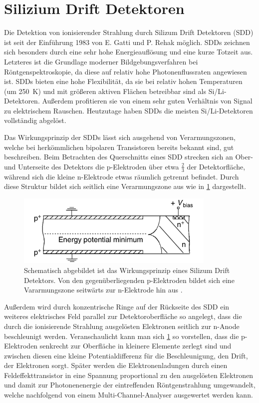 \section{Silizium Drift Detektoren}

Die Detektion von ionisierender Strahlung durch Silizum Drift Detektoren (SDD) ist seit der Einführung 1983 von E. Gatti und P. Rehak möglich. SDDs zeichnen sich besonders durch eine sehr hohe Energieauflösung und eine kurze Totzeit aus. Letzteres ist die Grundlage moderner Bildgebungsverfahren bei Röntgenspektroskopie, da diese auf relativ hohe Photonenflussraten angewiesen ist.   
SDDs bieten eine hohe Flexibilität, da sie bei relativ hohen Temperaturen (um \SI{250}{\kelvin}) und mit größeren aktiven Flächen betreibbar sind als Si/Li-Detektoren. Außerdem profitieren sie von einem sehr guten Verhältnis von Signal zu elektrischem Rauschen. Heutzutage haben SDDs die meisten Si/Li-Detektoren vollständig abgelöst.\newline

Das Wirkungsprinzip der SDDs lässt sich ausgehend von Verarmungszonen, welche bei herkömmlichen bipolaren Transistoren bereits bekannt sind, gut beschreiben. Beim Betrachten des Querschnitts eines SDD strecken sich an Ober- und Unterseite des Detektors die p-Elektroden über etwa $\frac{2}{3}$ der Detektorfläche, während sich die kleine n-Elektrode etwas räumlich getrennt befindet. Durch diese Struktur bildet sich seitlich eine Verarmungszone aus wie in \cref{fig:sdd_concept} dargestellt. 

\begin{figure}[H] 
  \centering
     \includegraphics[width=0.85\textwidth]{illustrations/sdd_concept.png}
  \caption[Prinzip eines SDD]{Schematisch abgebildet ist das Wirkungsprinzip eines Silizum Drift Detektors. Von den gegenüberliegenden p-Elektroden bildet sich eine Vararmungszone seitwärts zur n-Elektrode hin aus \cite[S.~223, bearbeitet]{bbbook}.}
  \label{fig:sdd_concept}
\end{figure}

Außerdem wird durch konzentrische Ringe auf der Rückseite des SDD ein weiteres elektrisches Feld parallel zur Detektoroberfläche so angelegt, dass die durch die ionisierende Strahlung ausgelösten Elektronen seitlich zur n-Anode beschleunigt werden. Veranschaulicht kann man sich \cref{fig:sdd_concept} so vorstellen, dass die p-Elektroden senkrecht zur Oberfläche in kleinere Elemente zerlegt sind und zwischen diesen eine kleine Potentialdifferenz für die Beschleunigung, den Drift, der Elektronen sorgt. Später werden die Elektronenladungen durch einen Feldeffekttransistor in eine Spannung proportional zu den ausgelösten Elektronen und damit zur Photonenenergie der eintreffenden Röntgenstrahlung umgewandelt, welche nachfolgend von einem Multi-Channel-Analyser ausgewertet werden kann.



